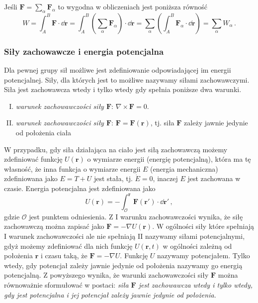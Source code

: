 \documentclass[../main.tex]{subfiles}
\begin{document}
\noindent{}
\medskip

Jeśli \(\mathbf{F}=\sum_\alpha\mathbf{F}_\alpha\) to wygodna w obliczeniach jest poniższa równość
\begin{equation*}
    W=\int_{A}^B\mathbf{F}\cdot \dd\mathbf{r}=\int_{A}^B\left(\sum_\alpha\mathbf{F}_\alpha\right)\cdot \dd\mathbf{r}=\sum_\alpha\left(\int_A^B \mathbf{F}_\alpha\cdot \dd\mathbf{r}\right)=\sum_\alpha W_\alpha\,.
\end{equation*}
\subsubsection{Siły zachowawcze i energia potencjalna}
Dla pewnej grupy sił możliwe jest zdefiniowanie odpowiadającej im energii potencjalnej. Siły, dla
których jest to możliwe nazywamy siłami zachowawczymi. Siła jest zachowawcza wtedy i tylko wtedy gdy
spełnia poniższe dwa warunki.
\begin{enumerate}[I.]
    \item \textit{warunek zachowawczości siły \(\mathbf{F}\)}: \(\nabla\times\mathbf{F}=0\).
    \item \textit{warunek zachowawczości siły \(\mathbf{F}\)}:
    \(\mathbf{F}=\mathbf{F}(\mathbf{r})\), tj. siła \(\mathbf{F}\) zależy jawnie jedynie od
    położenia ciała 
\end{enumerate}
W przypadku, gdy siła działająca na ciało jest siłą zachowawczą możemy zdefiniować funkcję
\(U(\mathbf{r})\) o wymiarze energii (energię potencjalną), która ma tę własność, że inna funkcja o
wymiarze energii \(E\) (energia mechaniczna) zdefiniowana jako \(E=T+U\) jest stała, tj. \(\dot
E=0\), inaczej \(E\) jest zachowana w czasie. Energia potencjalna jest zdefiniowana jako
\begin{equation*}
    U(\mathbf{r})=-\int_{\mathcal{O}}^\mathbf{r}\mathbf{F}(\mathbf{r}')\cdot \dd\mathbf{r}'\,,
\end{equation*}
gdzie \(\mathcal{O}\) jest punktem odniesienia. Z I warunku zachowawczości wynika, że siłę
zachowawczą można zapisać jako \(\mathbf{F}=-\nabla U(\mathbf{r})\). W ogólności siły które
spełniają I warunek zachowawczości ale nie spełniają II nazywamy siłami potencjalnymi, gdyż możemy
zdefiniować dla nich funkcję \(U(\mathbf{r},t)\) w ogólności zależną od położenia \(\mathbf{r}\) i
czasu taką, że \(\mathbf{F}=-\nabla U\). Funkcję \(U\) nazywamy potencjałem. Tylko wtedy, gdy
potencjał zależy jawnie jedynie od położenia nazywamy go energią potencjalną. Z powyższego wynika,
że warunki zachowawczości siły \(\mathbf{F}\) można równoważnie sformułować w postaci: \textit{siła
\(\mathbf{F}\) jest zachowawcza wtedy i tylko wtedy, gdy jest potencjalna i jej potencjał zależy
jawnie jedynie od położenia.}
\end{document}
